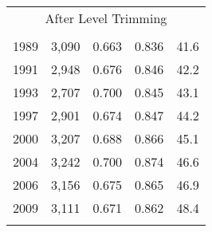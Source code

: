 \begin{tabular}{l p{2cm} p{2cm} p{2cm} p{2cm}}
\\
\multicolumn{5}{c}{After Level Trimming}  \\
\\
1989            &      3,090  &       0.663       &  0.836       &       41.6          \\
1991            &      2,948  &       0.676       &  0.846       &       42.2          \\
1993            &      2,707  &       0.700       &  0.845       &       43.1          \\
1997            &      2,901  &       0.674       &  0.847       &       44.2          \\
2000            &      3,207  &       0.688       &  0.866       &       45.1          \\
2004            &      3,242  &       0.700       &  0.874       &       46.6          \\
2006            &      3,156  &       0.675       &  0.865       &       46.9          \\
2009            &      3,111  &       0.671       &  0.862       &       48.4          \\
\\
\bottomrule
\end{tabular}